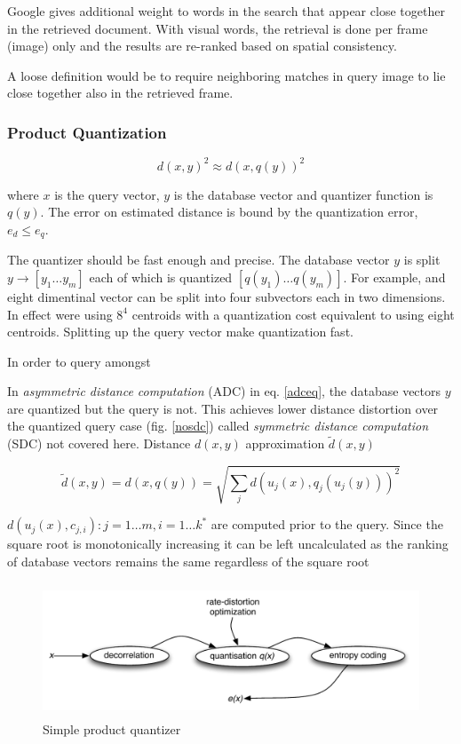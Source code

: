 \documentclass[english,12pt,a4paper,pdftex,elec,utf8]{aaltothesis}
\begin{document}
Google gives additional weight to words in the search that appear close together in the retrieved document. With visual words, the retrieval is done per frame (image) only and the results are re-ranked based on spatial consistency.

A loose definition would be to require neighboring matches in query image to lie close together also in the retrieved frame.

\subsubsection{Product Quantization} \label{PQ}

\begin{equation}
  \label{quantizereq}
d(x,y)^2 \approx d(x,q(y))^2
\end{equation}

where $x$ is the query vector, $y$ is the database vector and quantizer function is $q(y)$. The error on estimated distance is bound by the quantization error, $e_d \leq e_q$.  \cite{Jegou2014}

The quantizer should be fast enough and precise. The database vector $y$ is split $y \rightarrow [y_1 \ldots y_m]$ each of which is quantized $[q(y_1)\ldots q(y_m)]$. For example, and eight dimentinal vector can be split into four subvectors each in two dimensions. In effect were using $8^4$ centroids with a quantization cost equivalent to using eight centroids. Splitting up the query vector make quantization fast. \cite{Jegou2014}

In order to query amongst

In \emph{asymmetric distance computation} (ADC) in eq. \ref{adceq}, the database vectors $y$ are quantized but the query is not. This achieves lower distance distortion over the quantized query case (fig. \ref{nosdc}) called \emph{symmetric distance computation} (SDC) not covered here. Distance $d(x,y)$ approximation $\tilde{d}(x,y)$

\begin{equation}
  \label{adceq}
  \tilde{d}(x,y)=d(x, q(y))=\sqrt{\sum_jd(u_j(x),q_j(u_j(y)))^2}
\end{equation}

$d(u_j(x),c_{j,i}) : j = 1\ldots m,i=1\ldots k^*$ are computed prior to the query. Since the square root is monotonically increasing it can be left uncalculated as the ranking of database vectors remains the same regardless of the square root\cite{Jegou2011}


\begin{figure}[htb]
\begin{center}
\includegraphics[height=4cm]{figures/pq}
\end{center}
\caption{Simple product quantizer \cite{Jegou2014}}
\label{pqfig}
\end{figure}
\end{document}
